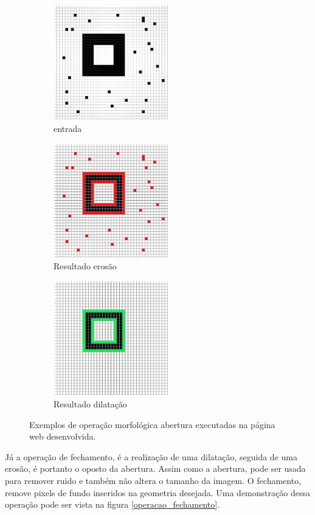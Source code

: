 \documentclass[conference,harvard,brazil,english]{sbatex}
\begin{document}
\begin{figure}[htp]
\centering
	\begin{subfigure}{0.5\textwidth}
	    \centering
		\includegraphics[width=5cm]{Abertura_original.PNG}
    	\caption{entrada}
  	\end{subfigure}
	\begin{subfigure}{0.5\textwidth}
	    \centering
      	\includegraphics[width=5cm]{Abertura_erode.PNG}
      	\caption{Resultado erosão}
    \end{subfigure}
	\begin{subfigure}{0.5\textwidth}
	    \centering
      	\includegraphics[width=5cm]{Abertura_dilate.PNG}
      	\caption{Resultado dilatação}
    \end{subfigure}
\caption{Exemplos de operação morfológica abertura executadas na página web desenvolvida.}
\label{operacao_abertura}
\end{figure}

Já a operação de fechamento, é a realização de uma dilatação, seguida de uma erosão, é portanto o oposto da abertura. Assim como a abertura, pode ser usada para remover ruido e também não altera o tamanho da imagem. O fechamento, remove pixels de fundo inseridos na geometria desejada. Uma demonstração dessa operação pode ser vista na figura \ref{operacao_fechamento}.
\end{document}
